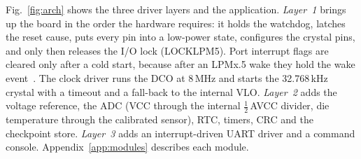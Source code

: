 \documentclass[11pt,a4paper]{article}
\begin{document}
Fig.~\ref{fig:arch} shows the three driver layers and the application. \emph{Layer~1} brings up the board in the order the hardware requires: it holds the watchdog, latches the reset cause, puts every pin into a low-power state, configures the crystal pins, and only then releases the I/O lock (LOCKLPM5). Port interrupt flags are cleared only after a cold start, because after an LPMx.5 wake they hold the wake event~\cite{ti_slau367}. The clock driver runs the DCO at 8\,MHz and starts the 32.768\,kHz crystal with a timeout and a fall-back to the internal VLO. \emph{Layer~2} adds the voltage reference, the ADC (VCC through the internal \(\tfrac{1}{2}\)\,AVCC divider, die temperature through the calibrated sensor), RTC, timers, CRC and the checkpoint store. \emph{Layer~3} adds an interrupt-driven UART driver and a command console. Appendix~\ref{app:modules} describes each module.
\end{document}
